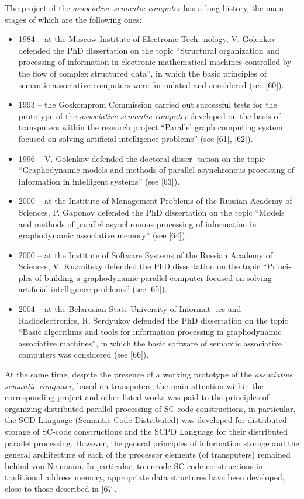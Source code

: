 \documentclass{article}
\begin{document}
\begin{multicols}{2}
\par The project of the \textit{associative semantic computer} has a long history, the main stages of which are the following ones: \\ 
\begin{itemize}
    \item 1984 – at the Moscow Institute of Electronic Tech- nology, V. Golenkov defended the PhD dissertation on the topic “Structural organization and processing of information in electronic mathematical machines controlled by the flow of complex structured data”, in which the basic principles of semantic associative computers were formulated and considered (see [60]).
    \item 1993 – the Goskomprom Commission carried out successful tests for the prototype of the \textit{associative semantic computer} developed on the basis of transputers within the research project “Parallel graph computing system focused on solving artificial intelligence problems” (see [61], [62]).
    \item 1996 – V. Golenkov defended the doctoral disser- tation on the topic “Graphodynamic models and methods of parallel asynchronous processing of information in intelligent systems” (see [63]).
    \item 2000 – at the Institute of Management Problems of the Russian Academy of Sciences, P. Gaponov defended the PhD dissertation on the topic “Models and methods of parallel asynchronous processing of information in graphodynamic associative memory” (see [64]).
    \item 2000 – at the Institute of Software Systems of the Russian Academy of Sciences, V. Kuzmitsky defended the PhD dissertation on the topic “Princi- ples of building a graphodynamic parallel computer focused on solving artificial intelligence problems” (see [65]).
    \item 2004 – at the Belarusian State University of Informat- ics and Radioelectronics, R. Serdyukov defended the PhD dissertation on the topic “Basic algorithms and tools for information processing in graphodynamic associative machines”, in which the basic software of semantic associative computers was considered (see [66]).
\end{itemize}
\par At the same time, despite the presence of a working prototype of the \textit{associative semantic computer}, based on transputers, the main attention within the corresponding project and other listed works was paid to the principles of organizing distributed parallel processing of SC-code constructions, in particular, the SCD Language (Semantic Code Distributed) was developed for distributed storage of SC-code constructions and the SCPD Language for their distributed parallel processing. However, the general principles of information storage and the general architecture of each of the processor elements (of transputers) remained behind von Neumann. In particular, to encode SC-code constructions in traditional address memory, appropriate data structures have been developed, close to those described in [67].
\end{multicols}
\end{document}
